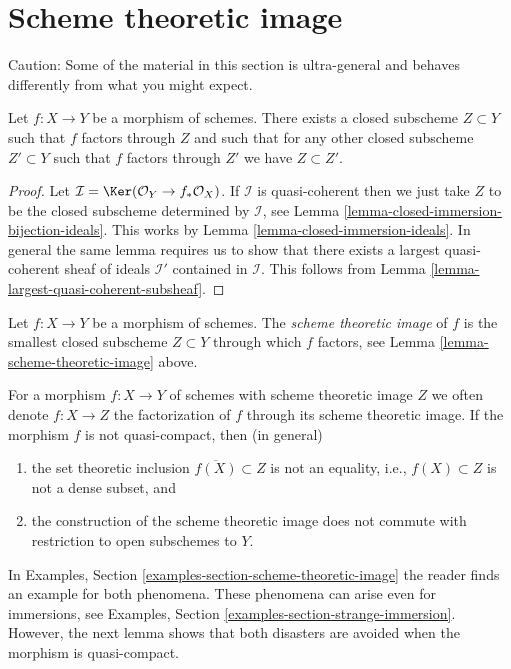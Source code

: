 \section{Scheme theoretic image}
\label{section-scheme-theoretic-image}

\noindent
Caution: Some of the material in this section is ultra-general and
behaves differently from what you might expect.

\begin{lemma}
\label{lemma-scheme-theoretic-image}
Let $f : X \to Y$ be a morphism of schemes. There exists a closed
subscheme $Z \subset Y$ such that $f$ factors through $Z$ and such
that for any other closed subscheme $Z' \subset Y$ such that $f$
factors through $Z'$ we have $Z \subset Z'$.
\end{lemma}

\begin{proof}
Let $\mathcal{I} = \Ker(\mathcal{O}_Y \to f_*\mathcal{O}_X)$.
If $\mathcal{I}$ is quasi-coherent then we just take $Z$ to be the
closed subscheme determined by $\mathcal{I}$, see
Lemma \ref{lemma-closed-immersion-bijection-ideals}. This works by
Lemma \ref{lemma-closed-immersion-ideals}.
In general the same lemma requires us to show that there exists
a largest quasi-coherent sheaf of ideals $\mathcal{I}'$ contained in
$\mathcal{I}$.
This follows from Lemma \ref{lemma-largest-quasi-coherent-subsheaf}.
\end{proof}

\begin{definition}
\label{definition-scheme-theoretic-image}
Let $f : X \to Y$ be a morphism of schemes. The {\it scheme theoretic image}
of $f$ is the smallest closed subscheme $Z \subset Y$ through which $f$
factors, see Lemma \ref{lemma-scheme-theoretic-image} above.
\end{definition}

\noindent
For a morphism $f : X \to Y$ of schemes with scheme theoretic image $Z$
we often denote $f : X \to Z$ the factorization of $f$
through its scheme theoretic image. If the morphism $f$ is not
quasi-compact, then (in general)
\begin{enumerate}
\item the set theoretic inclusion $\overline{f(X)} \subset Z$
is not an equality, i.e., $f(X) \subset Z$ is not a dense subset, and
\item the construction of the scheme theoretic image does not commute with
restriction to open subschemes to $Y$.
\end{enumerate}
In Examples, Section \ref{examples-section-scheme-theoretic-image}
the reader finds an example for both phenomena.
These phenomena can arise even for immersions, see
Examples, Section \ref{examples-section-strange-immersion}.
However, the next lemma shows that both disasters are avoided
when the morphism is quasi-compact.

